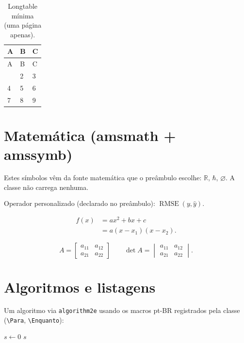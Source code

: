 \documentclass[dsc]{ufrj}
\DeclareMathOperator{\RMSE}{RMSE}
\begin{document}
  \begin{longtable}{lll}
    \caption{Longtable mínima (uma página apenas).}\label{tab:long}\\
    \toprule A & B & C \\ \midrule \endfirsthead
    \toprule A & B & C \\ \midrule \endhead
    \bottomrule \endfoot
    \bottomrule \endlastfoot
    1 & 2 & 3 \\
    4 & 5 & 6 \\
    7 & 8 & 9 \\
  \end{longtable}

  \chapter{Matemática (amsmath + amssymb)}
  \label{cap:math}

  Estes símbolos vêm da fonte matemática que o preâmbulo escolhe:
  $\mathbb{R}$, $\hbar$, $\varnothing$. A classe não carrega nenhuma.

  Operador personalizado (declarado no preâmbulo):
  $\RMSE(y,\hat{y})$.

  \begin{align}
    f(x) &= a x^2 + b x + c \\
         &= a (x - x_1)(x - x_2) .
  \end{align}

  \begin{equation}
    A = \begin{bmatrix} a_{11} & a_{12} \\ a_{21} & a_{22} \end{bmatrix}
    \qquad
    \det A = \begin{vmatrix} a_{11} & a_{12} \\ a_{21} & a_{22} \end{vmatrix} .
  \end{equation}

  \chapter{Algoritmos e listagens}
  \label{cap:algo}

  Um algoritmo via \texttt{algorithm2e} usando os macros pt-BR registrados
  pela classe (\verb|\Para|, \verb|\Enquanto|):
  \begin{algorithm}[H]
    \caption{Soma trivial de um vetor}
    $s \leftarrow 0$\;
    \KwRet $s$\;
  \end{algorithm}
\end{document}
